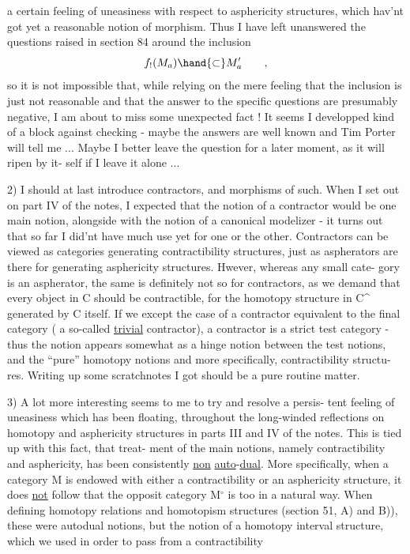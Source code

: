 
a certain feeling of uneasiness with respect to asphericity structures,
which hav'nt got yet a reasonable notion of morphism. Thus I have left
unanswered the questions raised in section 84 around the inclusion 
\[ f_{!}(M_{a}) \hand{\subset} M'_{a} \qquad , \]
so it is not impossible that, while relying on the mere feeling that
the inclusion is just not reasonable and that the answer to the specific
questions are presumably negative, I am about to miss some unexpected 
 fact ! It seems I developped kind of a block against checking -
maybe the answers are well known and Tim Porter will tell me ... Maybe
I better leave the question for a later moment, as it will ripen by it-%
self if I leave it alone ...

2) I should at last introduce contractors, and morphisms of such.
When I set out on part IV of the notes, I expected that the notion of a
contractor would be one main notion, alongside with the notion of a
canonical modelizer - it turns out that so far I did'nt have much use
yet for one or the other. Contractors c\hand{\unsure{-}}an be viewed as  categories
generating contractibility structures, just as aspherators are there
for generating asphericity structures. Hwever, whereas any small cate-%
gory is an aspherator, the same is definitely not so for contractors,
as we demand that every object in C should be contractible, for the
homotopy structure in C\^{} generated by C itself. If we except the case
of a contractor equivalent to the final category ( a so-called \uline{trivial}
contractor), a contractor is a strict test category - thus the notion
appears somewhat as a hinge notion between the test notions, and the
``pure'' homotopy notions and more specifically, contractibility structu-%
res. Writing up some scratchnotes I got should be a pure routine matter.

3) A lot more interesting seems to me to try and resolve a persis-%
tent feeling of uneasiness which has been floating, throughout the
long-winded reflections on homotopy and asphericity structures in parts
III and IV of the notes. This is tied up with this fact, that  treat-%
ment of the main notions, namely contractibility and asphericity, has
been consistently \uline{non} \uline{auto}-\uline{dual}. More specifically, when a category M
is endowed with either a contractibility or an asphericity structure,
it does \uline{not} follow that the opposit category M$^{\circ}$ is too in a natural way.
When defining homotopy relations and homotopism structures (section 51,
A) and B)), these were autodual notions, but the notion of a homotopy
interval structure, which we used in order to pass from a contractibility

